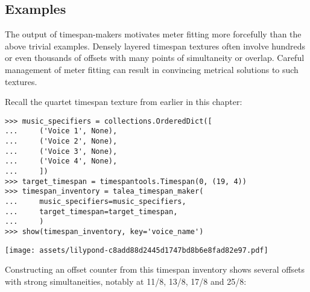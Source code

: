 \subsection{Examples}

The output of timespan-makers motivates meter fitting more forcefully than the
above trivial examples. Densely layered timespan textures often involve
hundreds or even thousands of offsets with many points of simultaneity or
overlap. Careful management of meter fitting can result in convincing metrical
solutions to such textures.

Recall the quartet timespan texture from earlier in this chapter:

\begin{comment}
<abjad>
music_specifiers = collections.OrderedDict([
    ('Voice 1', None),
    ('Voice 2', None),
    ('Voice 3', None),
    ('Voice 4', None),
    ])
target_timespan = timespantools.Timespan(0, (19, 4))
timespan_inventory = talea_timespan_maker(
    music_specifiers=music_specifiers,
    target_timespan=target_timespan,
    )
show(timespan_inventory, key='voice_name')
</abjad>
\end{comment}

\begin{abjadbookoutput}
\begin{singlespacing}
\vspace{-0.5\baselineskip}
\begin{lstlisting}
>>> music_specifiers = collections.OrderedDict([
...     ('Voice 1', None),
...     ('Voice 2', None),
...     ('Voice 3', None),
...     ('Voice 4', None),
...     ])
>>> target_timespan = timespantools.Timespan(0, (19, 4))
>>> timespan_inventory = talea_timespan_maker(
...     music_specifiers=music_specifiers,
...     target_timespan=target_timespan,
...     )
>>> show(timespan_inventory, key='voice_name')
\end{lstlisting}
\noindent\texttt{[image: assets/lilypond-c8add88d2445d1747bd8b6e8fad82e97.pdf]}
\end{singlespacing}
\end{abjadbookoutput}

\noindent Constructing an offset counter from this timespan inventory shows
several offsets with strong simultaneities, notably at 11/8, 13/8, 17/8 and
25/8:

\begin{comment}
<abjad>
offset_counter = metertools.OffsetCounter(timespan_inventory)
show(offset_counter, range_=(0, (19, 4)))
</abjad>
\end{comment}

